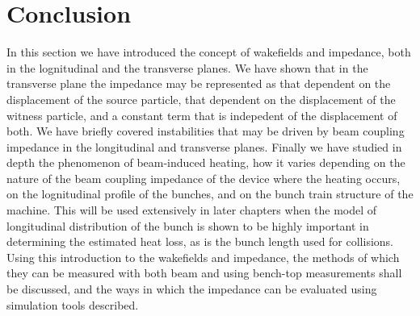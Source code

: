 \section{Conclusion}

In this section we have introduced the concept of wakefields and impedance, both in the lognitudinal and the transverse planes. We have shown that in the transverse plane the impedance may be represented as that dependent on the displacement of the source particle, that dependent on the displacement of the witness particle, and a constant term that is indepedent of the displacement of both. We have briefly covered instabilities that may be driven by beam coupling impedance in the longitudinal and transverse planes. Finally we have studied in depth the phenomenon of beam-induced heating, how it varies depending on the nature of the beam coupling impedance of the device where the heating occurs, on the lognitudinal profile of the bunches, and on the bunch train structure of the machine. This will be used extensively in later chapters when the model of longitudinal distribution of the bunch is shown to be highly important in determining the estimated heat loss, as is the bunch length used for collisions. Using this introduction to the wakefields and impedance, the methods of which they can be measured with both beam and using bench-top measurements shall be discussed, and the ways in which the impedance can be evaluated using simulation tools described.